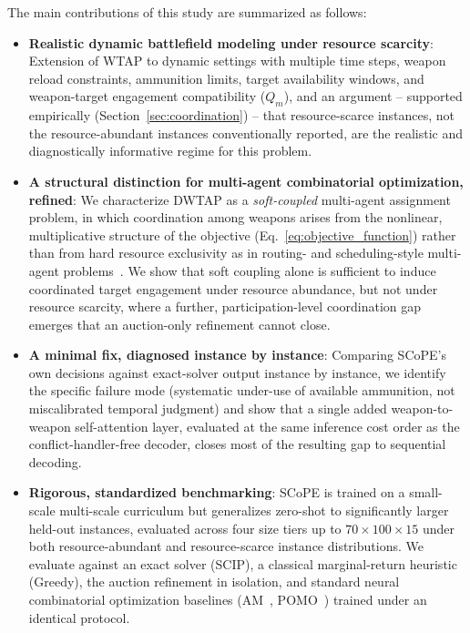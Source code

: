 The main contributions of this study are summarized as follows:

\begin{itemize}
    \item \textbf{Realistic dynamic battlefield modeling under resource scarcity}: Extension of WTAP to dynamic settings with multiple time steps, weapon reload constraints, ammunition limits, target availability windows, and weapon-target engagement compatibility ($Q_m$), and an argument -- supported empirically (Section~\ref{sec:coordination}) -- that resource-scarce instances, not the resource-abundant instances conventionally reported, are the realistic and diagnostically informative regime for this problem.

    \item \textbf{A structural distinction for multi-agent combinatorial optimization, refined}: We characterize DWTAP as a \emph{soft-coupled} multi-agent assignment problem, in which coordination among weapons arises from the nonlinear, multiplicative structure of the objective (Eq.~\eqref{eq:objective_function}) rather than from hard resource exclusivity as in routing- and scheduling-style multi-agent problems~\cite{parco2024}. We show that soft coupling alone is sufficient to induce coordinated target engagement under resource abundance, but not under resource scarcity, where a further, participation-level coordination gap emerges that an auction-only refinement cannot close.

    \item \textbf{A minimal fix, diagnosed instance by instance}: Comparing SCoPE's own decisions against exact-solver output instance by instance, we identify the specific failure mode (systematic under-use of available ammunition, not miscalibrated temporal judgment) and show that a single added weapon-to-weapon self-attention layer, evaluated at the same inference cost order as the conflict-handler-free decoder, closes most of the resulting gap to sequential decoding.

    \item \textbf{Rigorous, standardized benchmarking}: SCoPE is trained on a small-scale multi-scale curriculum but generalizes zero-shot to significantly larger held-out instances, evaluated across four size tiers up to $70 \times 100 \times 15$ under both resource-abundant and resource-scarce instance distributions. We evaluate against an exact solver (SCIP), a classical marginal-return heuristic (Greedy), the auction refinement in isolation, and standard neural combinatorial optimization baselines (AM~\cite{kool2018attention}, POMO~\cite{kwon2020pomo}) trained under an identical protocol.
\end{itemize}

